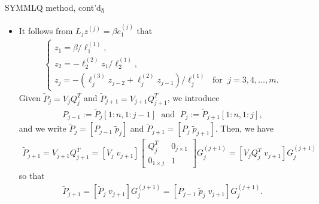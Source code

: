 \documentclass[t,usepdftitle=false]{beamer}
\begin{document}
\begin{frame}{SYMMLQ method, cont'd\textsubscript{5}}
\begin{itemize}
\item It follows from $L_jz^{(j)}=\beta e_1^{(j)}$ that 
\begin{align*}
\begin{cases}
z_1=\beta/\ell_1^{(1)},\\
z_2=-\ell_2^{(2)}z_1/\ell_2^{(1)},\\
z_j=-\left(\ell_j^{(3)}z_{j-2}+\ell_j^{(2)}z_{j-1}\right)/\ell_j^{(1)}\;\text{ for }\;j=3,4,\dots,m.
\end{cases}
\end{align*}
Given $\tilde{P}_j=V_jQ_j^T$ and $\tilde{P}_{j+1}=V_{j+1}Q_{j+1}^T$, we introduce
\begin{align*}
P_{j-1}:=\tilde{P}_j[1:n,1:j-1]
\;\text{ and }\;
P_{j}:=\tilde{P}_{j+1}[1:n,1:j],
\end{align*}
and we write $\tilde{P}_j=[P_{j-1}\;\tilde{p}_{j}]$ and $\tilde{P}_{j+1}=[P_{j}\;\tilde{p}_{j+1}]$.
Then, we have
\begin{align*}
\tilde{P}_{j+1}=V_{j+1}Q_{j+1}^T=
[V_j\;v_{j+1}]
\begin{bmatrix}
Q_j^T&0_{j\times 1}\\
0_{1\times j}&1
\end{bmatrix}
G_j^{(j+1)}=
[V_jQ_j^T\;v_{j+1}]G_j^{(j+1)}
\end{align*}
so that
\begin{align*}
\tilde{P}_{j+1}=
[\tilde{P}_j\;v_{j+1}]G_j^{(j+1)}=
[P_{j-1}\;\tilde{p}_{j}\;v_{j+1}]G_j^{(j+1)}.
\end{align*}
\end{itemize}
\end{frame}
\end{document}
